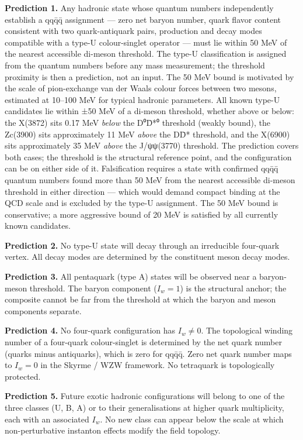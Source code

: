 \documentclass[12pt,a4paper]{article}
\begin{document}
\textbf{Prediction 1.} Any hadronic state whose quantum numbers
independently establish a qqq̄q̄ assignment --- zero net baryon number,
quark flavor content consistent with two quark-antiquark pairs,
production and decay modes compatible with a type-U colour-singlet
operator --- must lie within 50 MeV of the nearest accessible di-meson
threshold. The type-U classification is assigned from the quantum
numbers before any mass measurement; the threshold proximity is then a
prediction, not an input. The 50 MeV bound is motivated by the scale of
pion-exchange van der Waals colour forces between two mesons, estimated
at 10--100 MeV for typical hadronic parameters. All known type-U
candidates lie within ±50 MeV of a di-meson threshold, whether above or
below: the X(3872) sits 0.17 MeV \emph{below} the D⁰D̄*⁰ threshold
(weakly bound), the Zc(3900) sits approximately 11 MeV \emph{above} the
DD̄* threshold, and the X(6900) sits approximately 35 MeV \emph{above}
the J/ψψ(3770) threshold. The prediction covers both cases; the
threshold is the structural reference point, and the configuration can
be on either side of it. Falsification requires a state with confirmed
qqq̄q̄ quantum numbers found more than 50 MeV from the nearest accessible
di-meson threshold in either direction --- which would demand compact
binding at the QCD scale and is excluded by the type-U assignment. The
50 MeV bound is conservative; a more aggressive bound of 20 MeV is
satisfied by all currently known candidates.

\textbf{Prediction 2.} No type-U state will decay through an irreducible
four-quark vertex. All decay modes are determined by the constituent
meson decay modes.

\textbf{Prediction 3.} All pentaquark (type A) states will be observed
near a baryon-meson threshold. The baryon component (\(I_w = 1\)) is the
structural anchor; the composite cannot be far from the threshold at
which the baryon and meson components separate.

\textbf{Prediction 4.} No four-quark configuration has \(I_w \neq 0\).
The topological winding number of a four-quark colour-singlet is
determined by the net quark number (quarks minus antiquarks), which is
zero for qqq̄q̄. Zero net quark number maps to \(I_w = 0\) in the Skyrme /
WZW framework. No tetraquark is topologically protected.

\textbf{Prediction 5.} Future exotic hadronic configurations will belong
to one of the three classes (U, B, A) or to their
generalisations at higher quark multiplicity, each with an associated
\(I_w\). No new class can appear below the scale at which
non-perturbative instanton effects modify the field topology.
\end{document}

